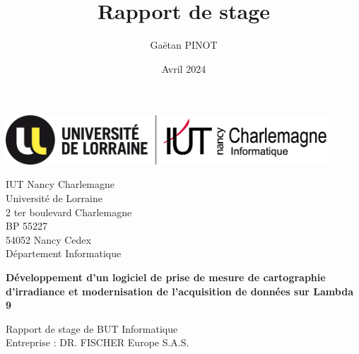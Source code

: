 \documentclass[12pt]{article}
\title{\Large\textbf{Rapport de stage}}
\author{Gaëtan PINOT}
\date{Avril 2024}
\begin{document}

\begin{center}
	\includegraphics[width=12cm]{Logo_IUT-UL_dept_info.png}
\end{center}

\vspace{1cm}

\noindent
{\large
IUT Nancy Charlemagne\\
Université de Lorraine\\
2 ter boulevard Charlemagne\\
BP 55227\\
54052 Nancy Cedex\\[5mm]
Département Informatique
}

\vspace{5cm}

\begin{center}
	{\huge
	\textbf{Développement d'un logiciel de prise de mesure de cartographie d'irradiance et modernisation de l'acquisition de données sur Lambda 9}
	}
\end{center}

\vspace{5cm}

{\Large
\noindent
Rapport de stage de BUT Informatique\\
Entreprise : DR. FISCHER Europe S.A.S.
}
\end{document}
